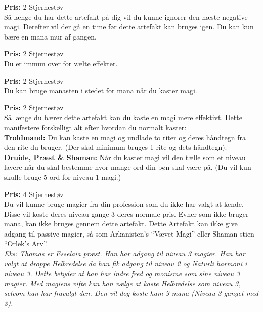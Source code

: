 \begin{artefakt*}
\textbf{Pris:} 2 Stjernestøv\\
Så længe du har dette artefakt på dig vil du kunne ignorer den næste negative magi. Derefter vil der gå en time før dette artefakt kan bruges igen. Du kan kun bære en mana mur af gangen.
\end{artefakt*}

\begin{artefakt*}
\textbf{Pris:} 2 Stjernestøv\\
Du er immun over for vælte effekter.
\end{artefakt*}

\begin{artefakt*}
\textbf{Pris:} 2 Stjernestøv\\
Du kan bruge manasten i stedet for mana når du kaster magi.
\end{artefakt*} 

\begin{artefakt*}
\textbf{Pris:} 2 Stjernestøv\\
Så længe du bærer dette artefakt kan du kaste en magi mere effektivt. Dette manifestere forskelligt alt efter hvordan du normalt kaster:\\
\textbf{Troldmand:}  Du kan kaste en magi og undlade to riter og deres håndtegn fra den rite du bruger. (Der skal minimum bruges 1 rite og dets håndtegn).\\
\textbf{Druide, Præst \& Shaman:} Når du kaster magi vil den tælle som et niveau lavere når du skal bestemme hvor mange ord din bøn skal være på. (Du vil kun skulle bruge 5 ord for niveau 1 magi.)\\
\end{artefakt*}

\begin{artefakt*}
\textbf{Pris:} 4 Stjernestøv\\
Du vil kunne bruge magier fra din profession som du ikke har valgt at kende. Disse vil koste deres niveau gange 3 deres normale pris. Evner som ikke bruger mana, kan ikke bruges gennem dette artefakt. Dette Artefakt kan ikke give adgang til passive magier, så som Arkanisten’s “Vævet Magi” eller Shaman stien “Orlek’s Arv”.\\
\textit{Eks: Thomas er Esselaia præst. Han har adgang til niveau 3 magier. Han har valgt at droppe Helbredelse da han fik adgang til niveau 2 og Naturli harmoni i niveau 3. Dette betyder at han har indre fred og monisme som sine niveau 3 magier. Med magiens vifte kan han vælge at kaste Helbredelse som niveau 3, selvom han har fravalgt den.  Den vil dog koste ham 9 mana (Niveau 3 ganget med 3). }
\end{artefakt*}